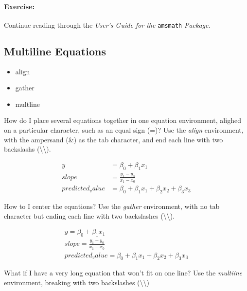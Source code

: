 		\paragraph{Exercise:}Continue reading through the \textit{User's Guide for the }\texttt{amsmath} \textit{Package}.

        \subsection{Multiline Equations}
        \label{Multiline Equations}
        
        \begin{framed}
            \begin{itemize}
                \item{align}
                \item{gather}
                \item{multline}
            \end{itemize}
        \end{framed}

		How do I place several equations together in one equation environment, alighed on a particular character, such as an equal sign (=)? Use the \textit{align} environment, with the ampersand (\&) as the tab character, and end each line with two backslashs (\textbackslash{}\textbackslash{}).

		\begin{align}
			y& = \beta_0 + \beta_1 x_1\\
			slope& = \frac{y_1 - y_0}{x_1 - x_0}\\
			predicted_value& = \beta_0 + \beta_1 x_1 + \beta_2 x_2 + \beta_3 x_3
		\end{align}

		How to I center the equations? Use the \textit{gather} environment, with no tab character but ending each line with two backslashes (\textbackslash{}\textbackslash{}).

		\begin{gather}
			y = \beta_0 + \beta_1 x_1\\
			slope = \frac{y_1 - y_0}{x_1 - x_0}\\
			predicted_value = \beta_0 + \beta_1 x_1 + \beta_2 x_2 + \beta_3 x_3
		\end{gather}

		What if I have a very long equation that won't fit on one line? Use the \textit{multiine} environment, breaking with two backslashes (\textbackslash{}\textbackslash{})

